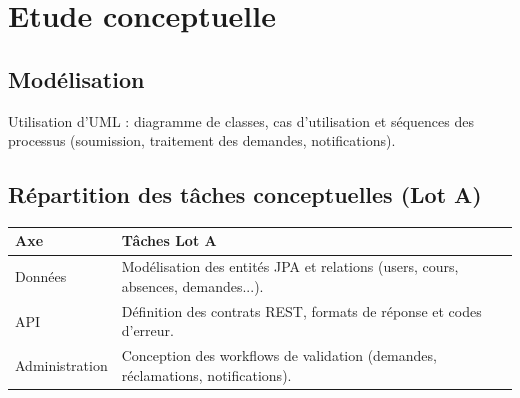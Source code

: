 \chapter{Etude conceptuelle}

\section*{Modélisation}
Utilisation d'UML : diagramme de classes, cas d'utilisation et séquences des processus (soumission, traitement des demandes, notifications).

\section*{Répartition des tâches conceptuelles (Lot A)}
\begin{tabularx}{\textwidth}{lX}
\toprule
\textbf{Axe} & \textbf{Tâches Lot A} \\
\midrule
Données & Modélisation des entités JPA et relations (users, cours, absences, demandes...). \\
API & Définition des contrats REST, formats de réponse et codes d'erreur. \\
Administration & Conception des workflows de validation (demandes, réclamations, notifications). \\
\bottomrule
\end{tabularx}
